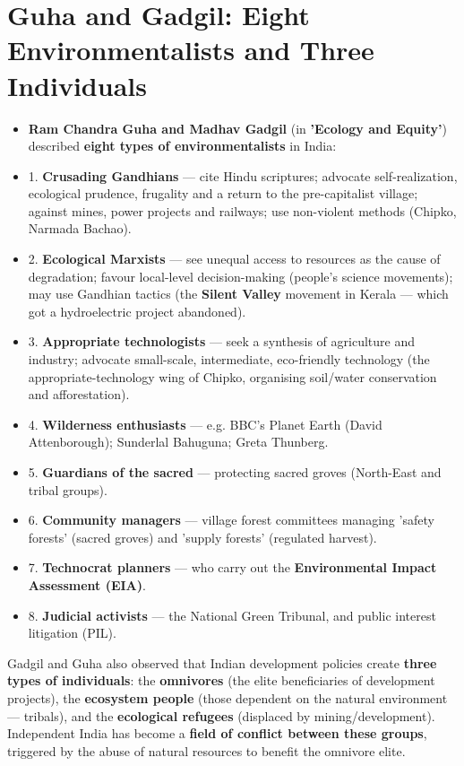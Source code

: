 \section{Guha and Gadgil: Eight Environmentalists and Three Individuals}

\begin{KeyConcept}
\begin{itemize}
\item \textbf{Ram Chandra Guha and Madhav Gadgil} (in \textbf{'Ecology and Equity'}) described \textbf{eight types of environmentalists} in India:
\item 1. \textbf{Crusading Gandhians} --- cite Hindu scriptures; advocate self-realization, ecological prudence, frugality and a return to the pre-capitalist village; against mines, power projects and railways; use non-violent methods (Chipko, Narmada Bachao).
\item 2. \textbf{Ecological Marxists} --- see unequal access to resources as the cause of degradation; favour local-level decision-making (people's science movements); may use Gandhian tactics (the \textbf{Silent Valley} movement in Kerala --- which got a hydroelectric project abandoned).
\item 3. \textbf{Appropriate technologists} --- seek a synthesis of agriculture and industry; advocate small-scale, intermediate, eco-friendly technology (the appropriate-technology wing of Chipko, organising soil/water conservation and afforestation).
\item 4. \textbf{Wilderness enthusiasts} --- e.g. BBC's Planet Earth (David Attenborough); Sunderlal Bahuguna; Greta Thunberg.
\item 5. \textbf{Guardians of the sacred} --- protecting sacred groves (North-East and tribal groups).
\item 6. \textbf{Community managers} --- village forest committees managing 'safety forests' (sacred groves) and 'supply forests' (regulated harvest).
\item 7. \textbf{Technocrat planners} --- who carry out the \textbf{Environmental Impact Assessment (EIA)}.
\item 8. \textbf{Judicial activists} --- the National Green Tribunal, and public interest litigation (PIL).
\end{itemize}
\end{KeyConcept}

\begin{KeyConcept}
Gadgil and Guha also observed that Indian development policies create \textbf{three types of individuals}: the \textbf{omnivores} (the elite beneficiaries of development projects), the \textbf{ecosystem people} (those dependent on the natural environment --- tribals), and the \textbf{ecological refugees} (displaced by mining/development). Independent India has become a \textbf{field of conflict between these groups}, triggered by the abuse of natural resources to benefit the omnivore elite.
\end{KeyConcept}

